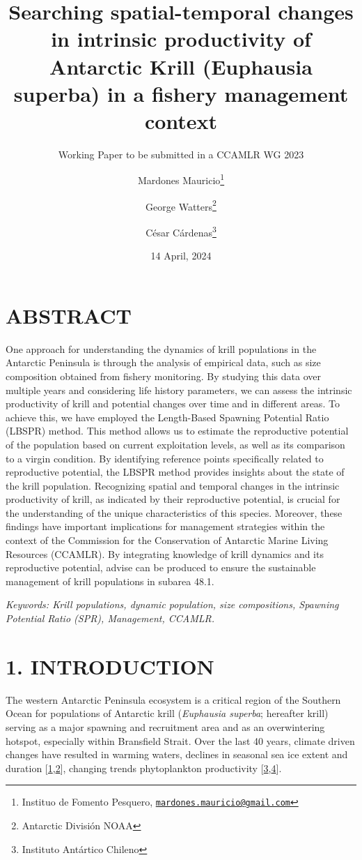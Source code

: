 \documentclass[
]{article}
\title{Searching spatial-temporal changes in intrinsic productivity of
Antarctic Krill (Euphausia superba) in a fishery management context}
\subtitle{Working Paper to be submitted in a CCAMLR WG 2023}
\author{Mardones Mauricio\footnote{Instituo de Fomento Pesquero,
  \href{mailto:mardones.mauricio@gmail.com}{\nolinkurl{mardones.mauricio@gmail.com}}} \and George
Watters\footnote{Antarctic División NOAA} \and César
Cárdenas\footnote{Instituto Antártico Chileno}}
\date{14 April, 2024}
\begin{document}
\maketitle

\newpage

\hypertarget{abstract}{%
\section{ABSTRACT}\label{abstract}}

One approach for understanding the dynamics of krill populations in the
Antarctic Peninsula is through the analysis of empirical data, such as
size composition obtained from fishery monitoring. By studying this data
over multiple years and considering life history parameters, we can
assess the intrinsic productivity of krill and potential changes over
time and in different areas. To achieve this, we have employed the
Length-Based Spawning Potential Ratio (LBSPR) method. This method allows
us to estimate the reproductive potential of the population based on
current exploitation levels, as well as its comparison to a virgin
condition. By identifying reference points specifically related to
reproductive potential, the LBSPR method provides insights about the
state of the krill population. Recognizing spatial and temporal changes
in the intrinsic productivity of krill, as indicated by their
reproductive potential, is crucial for the understanding of the unique
characteristics of this species. Moreover, these findings have important
implications for management strategies within the context of the
Commission for the Conservation of Antarctic Marine Living Resources
(CCAMLR). By integrating knowledge of krill dynamics and its
reproductive potential, advise can be produced to ensure the sustainable
management of krill populations in subarea 48.1.

\emph{Keywords: Krill populations, dynamic population, size
compositions, Spawning Potential Ratio (SPR), Management, CCAMLR.}

\newpage

\hypertarget{introduction}{%
\section{1. INTRODUCTION}\label{introduction}}

The western Antarctic Peninsula ecosystem is a critical region of the
Southern Ocean for populations of Antarctic krill (\emph{Euphausia
superba}; hereafter krill) serving as a major spawning and recruitment
area and as an overwintering hotspot, especially within Bransfield
Strait. Over the last 40 years, climate driven changes have resulted in
warming waters, declines in seasonal sea ice extent and duration
{[}\protect\hyperlink{ref-Stammerjohn2008a}{1},\protect\hyperlink{ref-Stammerjohn2008}{2}{]},
changing trends phytoplankton productivity
{[}\protect\hyperlink{ref-Saba2014}{3},\protect\hyperlink{ref-Siegel2013}{4}{]}.
\end{document}
